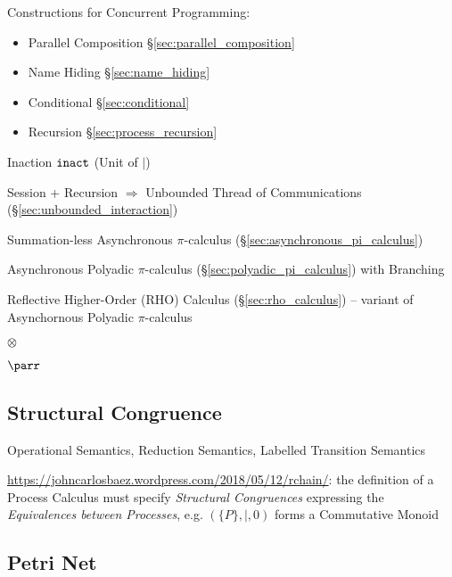Constructions for Concurrent Programming:
\cite{honda-vasconcelos-kubo98}
\begin{itemize}
  \item Parallel Composition \S\ref{sec:parallel_composition}
  \item Name Hiding \S\ref{sec:name_hiding}
  \item Conditional \S\ref{sec:conditional}
  \item Recursion \S\ref{sec:process_recursion}
\end{itemize}

Inaction $\mathtt{inact}$ (Unit of $|$)


Session + Recursion $\Rightarrow$ Unbounded Thread of Communications
(\S\ref{sec:unbounded_interaction}) \cite{honda-vasconcelos-kubo98}

Summation-less Asynchronous $\pi$-calculus
(\S\ref{sec:asynchronous_pi_calculus}) \cite{honda-vasconcelos-kubo98}

Asynchronous Polyadic $\pi$-calculus
(\S\ref{sec:polyadic_pi_calculus}) with Branching
\cite{honda-vasconcelos-kubo98}

\fist Reflective Higher-Order (RHO) Calculus (\S\ref{sec:rho_calculus}) --
variant of Asynchornous Polyadic $\pi$-calculus


$\otimes$

$\parr$



\subsection{Structural Congruence}\label{sec:structural_congruence}

Operational Semantics, Reduction Semantics, Labelled Transition Semantics

\url{https://johncarlosbaez.wordpress.com/2018/05/12/rchain/}: the definition
of a Process Calculus must specify \emph{Structural Congruences} expressing the
\emph{Equivalences between Processes}, e.g. $(\{P\},|,0)$ forms a Commutative
Monoid



\subsection{Petri Net}\label{sec:petri_net}

